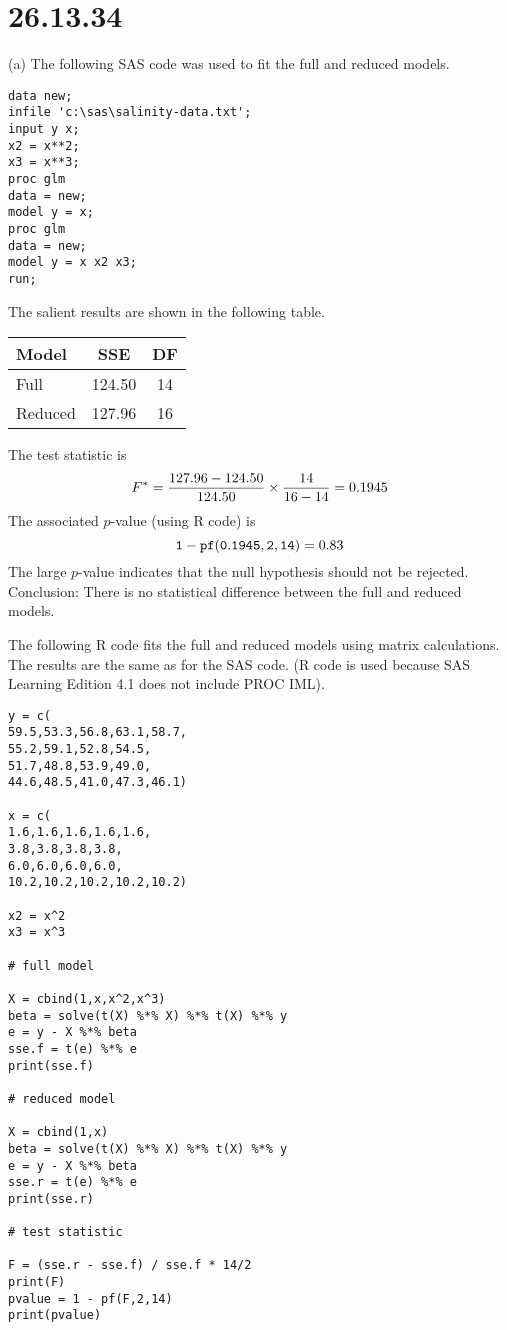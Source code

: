 \section*{26.13.34}
(a) The following SAS code was used to fit the full and reduced
models.
\begin{verbatim}
data new;
infile 'c:\sas\salinity-data.txt';
input y x;
x2 = x**2;
x3 = x**3;
proc glm
data = new;
model y = x;
proc glm
data = new;
model y = x x2 x3;
run;
\end{verbatim}
The salient results are shown in the following table.

\begin{center}
\begin{tabular}{lcc}
Model & SSE & DF\\
\hline
Full & 124.50 & 14\\
Reduced & 127.96 & 16
\end{tabular}
\end{center}

\noindent
The test statistic is
\[
F^*={127.96-124.50\over124.50}\times{14\over16-14}=0.1945
\]
The associated $p$-value (using R code) is
\[
{\tt 1-pf(0.1945,2,14)}=0.83
\]
The large $p$-value indicates that the null hypothesis should not be rejected.
Conclusion:
There is no statistical difference between the full and reduced
models.

\bigskip
\noindent
The following R code fits the full and reduced models using matrix calculations.
The results are the same as for the SAS code.
(R code is used because SAS Learning Edition 4.1 does not include
PROC IML).

\begin{verbatim}
y = c(
59.5,53.3,56.8,63.1,58.7,
55.2,59.1,52.8,54.5,
51.7,48.8,53.9,49.0,
44.6,48.5,41.0,47.3,46.1)

x = c(
1.6,1.6,1.6,1.6,1.6,
3.8,3.8,3.8,3.8,
6.0,6.0,6.0,6.0,
10.2,10.2,10.2,10.2,10.2)

x2 = x^2
x3 = x^3

# full model

X = cbind(1,x,x^2,x^3)
beta = solve(t(X) %*% X) %*% t(X) %*% y
e = y - X %*% beta
sse.f = t(e) %*% e
print(sse.f)

# reduced model

X = cbind(1,x)
beta = solve(t(X) %*% X) %*% t(X) %*% y
e = y - X %*% beta
sse.r = t(e) %*% e
print(sse.r)

# test statistic

F = (sse.r - sse.f) / sse.f * 14/2
print(F)
pvalue = 1 - pf(F,2,14)
print(pvalue)
\end{verbatim}

